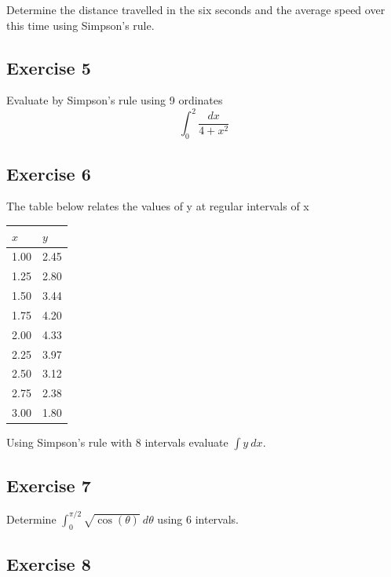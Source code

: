\documentclass[
  11pt,
  oneside]{book}
\newcommand{\slide}{}
\theoremstyle{definition}
\theoremstyle{definition}
\theoremstyle{definition}
\theoremstyle{definition}
\theoremstyle{remark}
\begin{document}
Determine the distance travelled in the six seconds and the average speed over this time using
Simpson's rule.

\slide

\subsection*{Exercise 5}\label{exercise-5-3}

Evaluate by Simpson's rule using 9 ordinates
\[
\int_0^2\frac{dx}{4+x^2}
\]

\slide

\subsection*{Exercise 6}\label{exercise-6-3}

The table below relates the values of y at regular intervals of x

\begin{tabular}{l|l}
\hline
$x$ & $y$\\
\hline
1.00 & 2.45\\
\hline
1.25 & 2.80\\
\hline
1.50 & 3.44\\
\hline
1.75 & 4.20\\
\hline
2.00 & 4.33\\
\hline
2.25 & 3.97\\
\hline
2.50 & 3.12\\
\hline
2.75 & 2.38\\
\hline
3.00 & 1.80\\
\hline
\end{tabular}

Using Simpson's rule with 8 intervals evaluate \(\displaystyle\int y\ dx\).

\slide

\subsection*{Exercise 7}\label{exercise-7-1}

Determine \(\displaystyle\int_0^{\pi/2}\sqrt{\cos(\theta)}\ d\theta\) using 6 intervals.

\slide

\subsection*{Exercise 8}\label{exercise-8}
\end{document}
